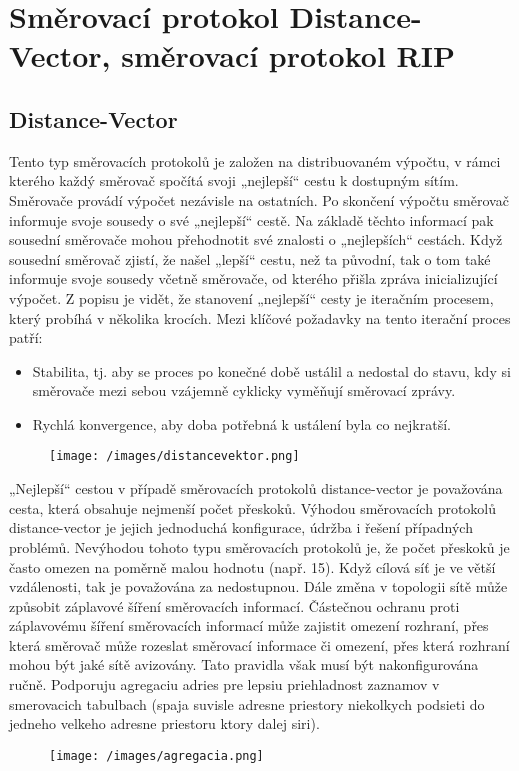 \section{Směrovací protokol Distance-Vector, směrovací protokol RIP}
\subsection{Distance-Vector}
Tento typ směrovacích protokolů je založen na distribuovaném výpočtu, v rámci 
kterého každý směrovač spočítá svoji „nejlepší“ cestu k dostupným sítím. Směrovače provádí 
výpočet nezávisle na ostatních. Po skončení výpočtu směrovač informuje svoje sousedy o své 
„nejlepší“ cestě. Na základě těchto informací pak sousední směrovače mohou přehodnotit své 
znalosti o „nejlepších“ cestách. Když sousední směrovač zjistí, že našel „lepší“ cestu, než ta 
původní, tak o tom také informuje svoje sousedy včetně směrovače, od kterého přišla zpráva 
inicializující výpočet. Z popisu je vidět, že stanovení „nejlepší“ cesty je iteračním procesem, 
který probíhá v několika krocích. Mezi klíčové požadavky na tento iterační 
proces patří:
\begin{itemize}
\item Stabilita, tj. aby se proces po konečné době ustálil a nedostal do stavu, kdy si 
směrovače mezi sebou vzájemně cyklicky vyměňují směrovací zprávy.
\item Rychlá konvergence, aby doba potřebná k ustálení byla co nejkratší.
\end{itemize}
\begin{figure}[!h]
  \begin{center}
    \texttt{[image: /images/distancevektor.png]}
  \end{center}
\end{figure}

„Nejlepší“ cestou v případě směrovacích protokolů distance-vector je považována cesta, 
která obsahuje nejmenší počet přeskoků. Výhodou směrovacích protokolů distance-vector je 
jejich jednoduchá konfigurace, údržba i řešení případných problémů.
Nevýhodou tohoto typu směrovacích protokolů je, že počet přeskoků je často omezen 
na poměrně malou hodnotu (např. 15). Když cílová síť je ve větší vzdálenosti, tak je 
považována za nedostupnou. Dále změna v topologii sítě může způsobit záplavové šíření 
směrovacích informací. Částečnou ochranu proti záplavovému šíření směrovacích informací 
může zajistit omezení rozhraní, přes která směrovač může rozeslat směrovací informace či 
omezení, přes která rozhraní mohou být jaké sítě avizovány. Tato pravidla však musí být 
nakonfigurována ručně. Podporuju agregaciu adries pre lepsiu priehladnost zaznamov v smerovacich tabulbach (spaja suvisle adresne priestory niekolkych podsieti do jedneho velkeho adresne priestoru ktory dalej siri).
\begin{figure}[!h]
  \begin{center}
    \texttt{[image: /images/agregacia.png]}
  \end{center}
\end{figure}
